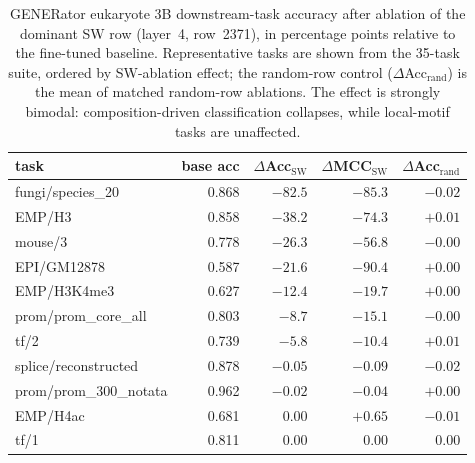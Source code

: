 \documentclass[11pt]{article}
\begin{document}
\begin{table}[H]
\centering\small
\begin{tabular}{lrrrr}
\toprule
task & base acc & $\Delta$Acc$_{\mathrm{SW}}$ & $\Delta$MCC$_{\mathrm{SW}}$ & $\Delta$Acc$_{\mathrm{rand}}$\\
\midrule
fungi/species\_20      & 0.868 & $-82.5$ & $-85.3$ & $-0.02$\\
EMP/H3                 & 0.858 & $-38.2$ & $-74.3$ & $+0.01$\\
mouse/3                & 0.778 & $-26.3$ & $-56.8$ & $-0.00$\\
EPI/GM12878            & 0.587 & $-21.6$ & $-90.4$ & $+0.00$\\
EMP/H3K4me3            & 0.627 & $-12.4$ & $-19.7$ & $+0.00$\\
prom/prom\_core\_all   & 0.803 & $-8.7$  & $-15.1$ & $-0.00$\\
tf/2                   & 0.739 & $-5.8$  & $-10.4$ & $+0.01$\\
\midrule
splice/reconstructed   & 0.878 & $-0.05$ & $-0.09$ & $-0.02$\\
prom/prom\_300\_notata & 0.962 & $-0.02$ & $-0.04$ & $+0.00$\\
EMP/H4ac               & 0.681 & $0.00$  & $+0.65$ & $-0.01$\\
tf/1                   & 0.811 & $0.00$  & $0.00$  & $0.00$\\
\bottomrule
\end{tabular}
\caption{GENERator eukaryote 3B downstream-task accuracy after
ablation of the dominant SW row (layer~4, row~2371), in percentage
points relative to the fine-tuned baseline. Representative tasks are
shown from the 35-task suite, ordered by SW-ablation effect; the
random-row control ($\Delta$Acc$_{\mathrm{rand}}$) is the mean of
matched random-row ablations. The effect is strongly bimodal:
composition-driven classification collapses, while local-motif
tasks are unaffected.}
\label{tab:generator_gue}
\end{table}
\end{document}
